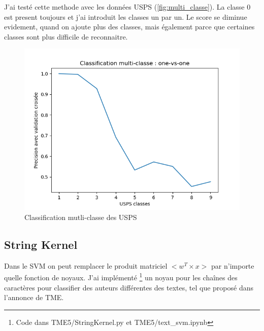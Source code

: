 \documentclass[a4paper,12pt]{article}
\begin{document}
J'ai testé cette methode avec les données USPS (\autoref{fig:multi_classe}). La classe 0 est present toujours et j'ai introduit les classes un par un.
Le score se diminue evidement, quand on ajoute plus des classes, mais également parce que certaines classes sont plus difficile de reconnaitre.

\begin{figure}[h!]
\caption{Classification mutli-classe des USPS}
\label{fig:multi_classe}
\includegraphics[width=0.5\linewidth]{images/tme5/multi_classe.png}
\centering
\end{figure}%

\subsection{String Kernel}

Dans le SVM on peut remplacer le produit matriciel $<w^T \times x>$ par n'importe quelle fonction de noyaux.
J'ai implémenté \footnote{Code dans TME5\slash StringKernel.py et TME5\slash text\_svm.ipynb} un noyau pour les chaînes des caractères pour classifier des auteurs différentes des textes, tel que proposé dans l'annonce de TME.



\end{document}
